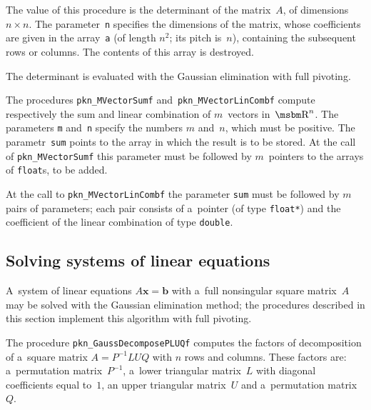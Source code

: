 \vspace{\bigskipamount}
The value of this procedure is the determinant of the matrix~$A$, of dimensions
$n\times n$. The parameter~\texttt{n} specifies the dimensions of the matrix,
whose coefficients are given in the array~\texttt{a}
(of length $n^2$; its pitch is~$n$), containing the subsequent rows or columns.
The contents of this array is destroyed.

The determinant is evaluated with the Gaussian elimination with full
pivoting.

\vspace{\bigskipamount}
The procedures \texttt{pkn\_MVectorSumf} and~\texttt{pkn\_MVectorLinCombf} compute
respectively the sum and linear combination of $m$~vectors in~$\R^n$. The parameters
\texttt{m} and~\texttt{n} specify the numbers $m$ and~$n$, which must be
positive. The parametr~\texttt{sum} points to the array in which the result
is to be stored. At the call of \texttt{pkn\_MVectorSumf} this parameter must be
followed by $m$~pointers to the arrays of \texttt{float}s, to be added.

At the call to \texttt{pkn\_MVectorLinCombf} the parameter
\texttt{sum} must be followed by $m$ pairs of parameters; each pair
consists of a~pointer (of type \texttt{float*}) and the coefficient of the
linear combination of type \texttt{double}.


\subsection{Solving systems of linear equations}

A~system of linear equations $A\bm{x}=\bm{b}$ with a~full nonsingular square
matrix~$A$ may be solved with the Gaussian elimination method; the procedures
described in this section implement this algorithm with full pivoting.

\vspace{\bigskipamount}
The procedure \texttt{pkn\_GaussDecomposePLUQf} computes the factors of
decomposition of a~square matrix $A=P^{-1}LUQ$ with $n$ rows and columns.
These factors are: a~permutation matrix~$P^{-1}$, a~lower triangular matrix~$L$
with diagonal coefficients equal to~$1$, an upper triangular matrix~$U$ and
a~permutation matrix~$Q$.


